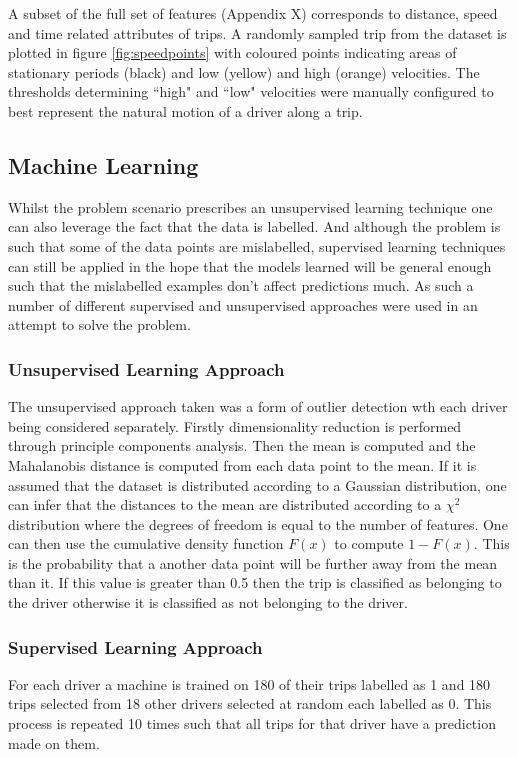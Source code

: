 \documentclass[a4paper, 11pt, twocolumn]{report}
\begin{document}

A subset of the full set of features (Appendix X) corresponds to distance, speed and time related attributes of trips.
A randomly sampled trip from the dataset is plotted in figure \ref{fig:speedpoints} with coloured points indicating areas of stationary periods (black) and low (yellow) and high (orange) velocities.
The thresholds determining ``high" and ``low" velocities were manually configured to best represent the natural motion of a driver along a trip.




\subsection{Machine Learning}
Whilst the problem scenario prescribes an unsupervised learning technique one can also leverage the fact that the data is labelled.
And although the problem is such that some of the data points are mislabelled, supervised learning techniques can still be applied in the hope that the models learned will be general enough such that the mislabelled examples don't affect predictions much.
As such a number of different supervised and unsupervised approaches were used in an attempt to solve the problem.

\subsubsection{Unsupervised Learning Approach}
The unsupervised approach taken was a form of outlier detection wth each driver being considered separately. Firstly dimensionality reduction is performed through principle components analysis. Then the mean is computed and the Mahalanobis distance is computed from each data point to the mean. If it is assumed that the dataset is distributed according to a Gaussian distribution, one can infer that the distances to the mean are distributed according to a $\chi^2$ distribution where the degrees of freedom is equal to the number of features. One can then use the cumulative density function $F(x)$ to compute $1 - F(x)$. This is the probability that a another data point will be further away from the mean than it. If this value is greater than 0.5 then the trip is classified as belonging to the driver otherwise it is classified as not belonging to the driver.

\subsubsection{Supervised Learning Approach}
For each driver a machine is trained on 180 of their trips labelled as 1 and 180 trips selected from 18 other drivers selected at random each labelled as 0. This process is repeated 10 times such that all trips for that driver have a prediction made on them. 
\end{document}
